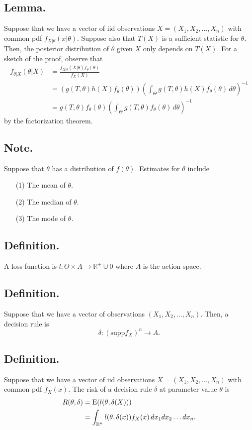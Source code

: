 \documentclass[titlepage]{article}
\begin{document}
\subsection{Lemma.} Suppose that we have a vector of iid observations $X = (X_{1}, X_{2}, \ldots, X_{n})$ with common pdf $f_{X|\theta}(x|\theta)$. Suppose also that $T(X)$ is a sufficient statistic for $\theta$. Then, the posterior distribution of $\theta$ given $X$ only depends on $T(X)$. For a sketch of the proof, observe that 
\begin{align*}
    f_{\theta|X}(\theta|X) &= \frac{f_{X|\theta}(X|\theta)f_{\theta}(\theta)}{f_{X}(X)} \\
                           &= (g(T, \theta)h(X)f_{\theta}(\theta))\left(\int_{\Theta}g(T, \theta)h(X)f_{\theta}(\theta)\, d\theta\right)^{-1} \\
                           &= g(T, \theta)f_{\theta}(\theta)\left(\int_{\Theta}g(T, \theta)f_{\theta}(\theta)\, d\theta\right)^{-1}
\end{align*}
by the factorization theorem.

\subsection{Note.} Suppose that $\theta$ has a distribution of $f(\theta)$. Estimates for $\theta$ include 
\begin{enumerate}
\item[(1)] The mean of $\theta$.
\item[(2)] The median of $\theta$.
\item[(3)] The mode of $\theta$.
\end{enumerate}

\subsection{Definition.} A loss function is $l: \Theta \times A \to \mathbb{R}^{+} \cup 0$ where $A$ is the action space.

\subsection{Definition.} Suppose that we have a vector of observations $(X_{1}, X_{2}, \ldots, X_{n})$. Then, a decision rule is 
$$\delta: (\text{supp} f_{X})^{n} \to A.$$

\subsection{Definition.} Suppose that we have a vector of iid observations $X = (X_{1}, X_{2}, \ldots, X_{n})$ with common pdf $f_{X}(x)$. The risk of a decision rule $\delta$ at parameter value $\theta$ is 
\begin{align*}
    R(\theta, \delta) &= \text{E}(l(\theta, \delta(X))) \\
                      &= \int_{\mathbb{R}^{n}}l(\theta, \delta(x))f_{X}(x)\, dx_{1}dx_{2}\ldots dx_{n}.
\end{align*}
\end{document}
